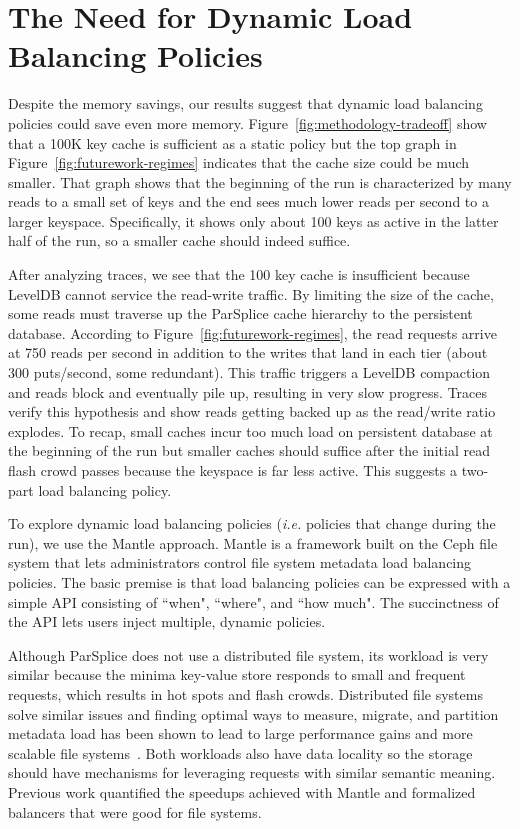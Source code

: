 \section{The Need for Dynamic Load Balancing Policies}
\label{sec:the-need-for-dynamic-load-balancing-policies}

Despite the memory savings, our results suggest that dynamic load balancing
policies could save even more memory.  Figure~\ref{fig:methodology-tradeoff}
show that a 100K key cache is sufficient as a static policy but the top graph
in Figure~\ref{fig:futurework-regimes} indicates that the cache size could be
much smaller. That graph shows that the beginning of the run is characterized
by many reads to a small set of keys and the end sees much lower reads per
second to a larger keyspace. Specifically, it shows only about 100 keys as
active in the latter half of the run, so a smaller cache should indeed suffice. 

After analyzing traces, we see that the 100 key cache is insufficient because
LevelDB cannot service the read-write traffic. By limiting the size of the
cache, some reads must traverse up the ParSplice cache hierarchy to the
persistent database.  According to Figure~\ref{fig:futurework-regimes}, the
read requests arrive at 750 reads per second in addition to the writes that
land in each tier (about 300 puts/second, some redundant). This traffic
triggers a LevelDB compaction and reads block and eventually pile up, resulting
in very slow progress. Traces verify this hypothesis and show reads getting
backed up as the read/write ratio explodes. To recap, small caches incur too
much load on persistent database  at the beginning of the run but smaller caches should
suffice after the initial read flash crowd passes because the keyspace is far
less active. This suggests a two-part load balancing policy.

To explore dynamic load balancing policies ({\it i.e.} policies that change
during the run), we use the Mantle approach.  Mantle is a framework built on the
Ceph file system that lets administrators control file system metadata load
balancing policies. The basic premise is that load balancing policies can be
expressed with a simple API consisting of ``when", ``where", and ``how much".
The succinctness of the API lets users inject multiple, dynamic policies.

Although ParSplice does not use a distributed file system, its workload is very
similar because the minima key-value store responds to small and frequent
requests, which results in hot spots and flash crowds.  Distributed file
systems solve similar issues and finding optimal ways to measure, migrate, and
partition metadata load has been shown to lead to large performance gains and
more scalable file systems~\cite{zheng:pdsw2014-batchfs,
zheng:pdsw2015-deltafs, grider:pdsw2015-marfs, ren:sc2014-indexfs,
patil:fast2011-giga+, brandt:msst2003-lh}.  Both workloads also have data
locality so the storage should have mechanisms for leveraging requests with
similar semantic meaning.  Previous work quantified the speedups achieved with
Mantle and formalized balancers that were good for file systems.

